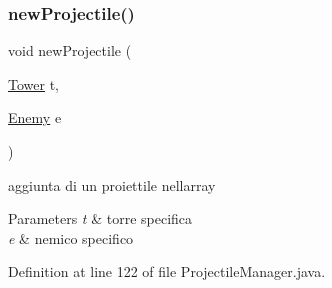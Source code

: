 \subsubsection{\texorpdfstring{new\+Projectile()}{newProjectile()}}
{\footnotesize\ttfamily void new\+Projectile (\begin{DoxyParamCaption}\item[{\hyperlink{classtowers_1_1_tower}{Tower}}]{t,  }\item[{\hyperlink{classenemies_1_1_enemy}{Enemy}}]{e }\end{DoxyParamCaption})}



aggiunta di un proiettile nell\textquotesingle{}array 


\begin{DoxyParams}{Parameters}
{\em t} & torre specifica \\
\hline
{\em e} & nemico specifico \\
\hline
\end{DoxyParams}


Definition at line 122 of file Projectile\+Manager.\+java.

